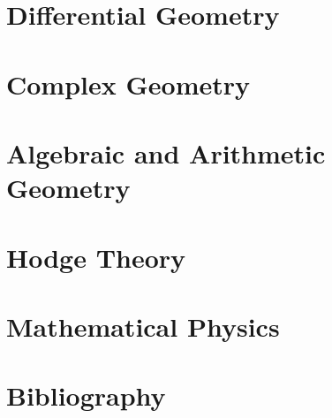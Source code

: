 \documentclass[11pt,openany]{book}
\begin{document}



\part{Differential Geometry}\label{part-differential-geometry}















\part{Complex Geometry}\label{part-complex-geometry}






\part{Algebraic and Arithmetic Geometry}\label{part-algebraic-geometry}














\part{Hodge Theory}\label{part-hodge-theory}







\part{Mathematical Physics}\label{part-mathematical-physics}





\part{Bibliography}\label{part-bibliography}

\ifplastex\else
  \cleardoublepage
\fi


\end{document}
